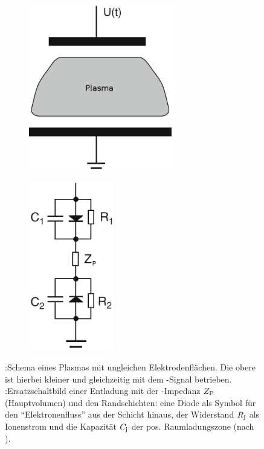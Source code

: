           \begin{figure}[!t]
            \centering
            \begin{subfigure}[b]{0.48\textwidth}
              \centering
              \includegraphics[width=0.7\textwidth,height=0.8\textwidth]{figs/schaltbildselfbiaspiel1.png}
              \caption{}
              \label{img:ungleichesplasma}
            \end{subfigure}
            \begin{subfigure}[b]{0.48\textwidth}
              \centering
              \includegraphics[width=0.4\textwidth,height=0.8\textwidth]{figs/schaltbildselfbiaspiel2.png}
              \caption{}
              \label{img:ersatzschaltbild}
            \end{subfigure}
            \caption{:Schema eines Plasmas mit ungleichen Elektrodenflächen. Die obere ist hierbei kleiner und gleichzeitig mit dem -Signal betrieben. :Ersatzschaltbild einer Entladung mit der -Impedanz $Z_\text{P}$ (Hauptvolumen) und den Randschichten: eine Diode als Symbol für den "`Elektronenfluss"' aus der Schicht hinaus, der Widerstand $R_\text{j}$ als Ionenstrom und die Kapazität $C_\text{j}$ der pos. Raumladungszone (nach \cite{Piel10}).}
          \end{figure}

